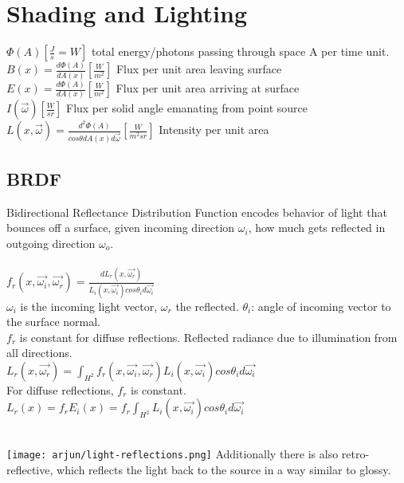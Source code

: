 \section{Shading and Lighting}
 $\Phi(A) [\frac{J}{s} = W]$ total energy/photons passing through space A per time unit.\\
 $B(x) = \frac{d\Phi(A)}{dA(x)} [\frac{W}{m^2}]$ Flux per unit area leaving surface \\
 $E(x) = \frac{d\Phi(A)}{dA(x)}[\frac{W}{m^2}]$ Flux per unit area arriving at surface\\
 $I(\overrightarrow{\omega}) [\frac{W}{sr}]$ Flux per solid angle emanating from point source\\
 $L(x, \overrightarrow{\omega}) = \frac{d^2 \Phi(A)}{cos\theta dA(x) d\overrightarrow{\omega}} [\frac{W}{m^2 sr}]$ Intensity per unit area
\subsection*{BRDF}
Bidirectional Reflectance Distribution Function encodes behavior of light that bounces off a surface, given incoming direction $\omega_i$, how much gets reflected in outgoing direction $\omega_o$. \\
 \\
$f_r(x,\overrightarrow{\omega_i}, \overrightarrow{\omega_r}) = \frac{dL_r(x, \overrightarrow{\omega_r})}{L_i(x, \overrightarrow{\omega_i}) cos \theta_i d\overrightarrow{\omega_i}}$ \\
$\omega_i$ is the incoming light vector, $\omega_r$ the reflected. $\theta_i$: angle of incoming vector to the surface normal. \\
$f_r$ is constant for diffuse reflections.
 Reflected radiance due to illumination from all directions. \\
$L_r(x, \overrightarrow{\omega_r}) = \int_{H^2} f_r(x, \overrightarrow{\omega_i}, \overrightarrow{\omega_r})L_i(x, \overrightarrow{\omega_i}) cos \theta_i d \overrightarrow{\omega_i}$ \\
For diffuse reflections, $f_r$ is constant. \\
$L_r(x) = f_r E_i(x) = f_r \int_{H^2}L_i(x, \overrightarrow{\omega_i}) cos \theta_i d \overrightarrow{\omega_i}$





\\
\texttt{[image: arjun/light-reflections.png]}
Additionally there is also retro-reflective, which reflects the light back to the source in a way similar to glossy. 

